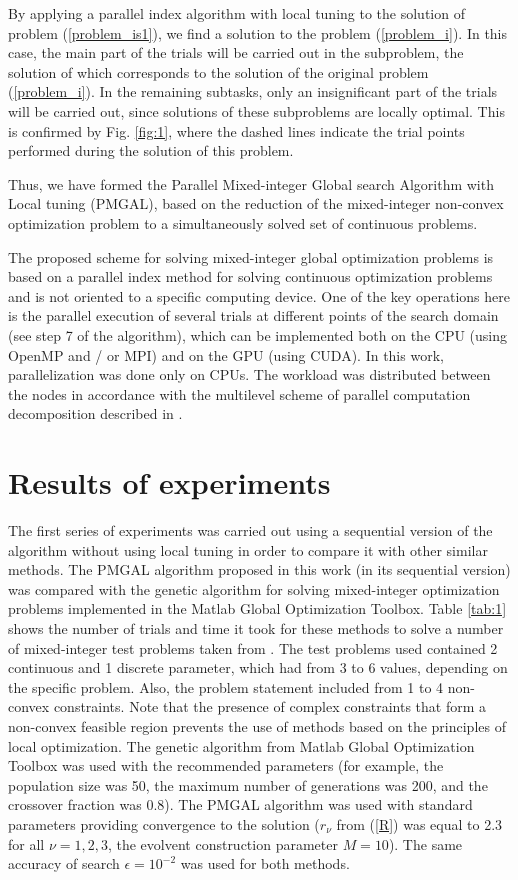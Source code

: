 \documentclass[
11pt,%
tightenlines,%
twoside,%
onecolumn,%
nofloats,%
nobibnotes,%
nofootinbib,%
superscriptaddress,%
noshowpacs,%
centertags]%
{revtex4}
\begin{document}
By applying a parallel index algorithm with local tuning to the solution of problem  (\ref{problem_is1}), we find a solution to the problem  (\ref{problem_i}). In this case, the main part of the trials will be carried out in the subproblem, the solution of which corresponds to the solution of the original problem (\ref{problem_i}). In the remaining subtasks, only an insignificant part of the trials will be carried out, since solutions of these subproblems are locally optimal. This is confirmed by Fig. \ref{fig:1}, where the dashed lines indicate the trial points performed during the solution of this problem.

Thus, we have formed the Parallel Mixed-integer Global search Algorithm with Local tuning (PMGAL), based on the reduction of the mixed-integer non-convex optimization problem to a simultaneously solved set of continuous problems.

The proposed scheme for solving mixed-integer global optimization problems is based on a parallel index method for solving continuous optimization problems and is not oriented to a specific computing device.  One of the key operations here is the parallel execution of several trials at different points of the search domain (see step 7 of the algorithm), which can be implemented both on the CPU (using OpenMP and / or MPI) and on the GPU (using CUDA). 
In this work, parallelization was done only on CPUs. The workload was distributed between the nodes in accordance with the multilevel scheme of parallel computation decomposition described in \cite{Strongin2018,Barkalov2020}.

\section{Results of experiments}

The first series of experiments was carried out using a sequential version of the algorithm without using local tuning in order to compare it with other similar methods.
The PMGAL algorithm proposed in this work (in its sequential version) was compared with the genetic algorithm for solving mixed-integer optimization problems implemented in the Matlab Global Optimization Toolbox. Table \ref{tab:1} shows the number of trials and time it took for these methods to solve a number of mixed-integer test problems taken from \cite{Deep,Floudas}.  
The test problems used contained 2 continuous and 1 discrete parameter, which had from 3 to 6 values, depending on the specific problem.
Also, the problem statement included from 1 to 4 non-convex constraints.  
Note that the presence of complex constraints that form a non-convex feasible region prevents the use of methods based on the principles of local optimization. 
The genetic algorithm from Matlab Global Optimization Toolbox was used with the recommended parameters (for example, the population size was 50, the maximum number of generations was 200, and the crossover fraction was 0.8). The PMGAL algorithm was used with standard parameters providing convergence to the solution ($r_\nu$ from (\ref{R}) was equal to 2.3 for all $\nu = 1,2,3$, the evolvent construction parameter $M=10$).
The same accuracy of search $\epsilon = 10^{-2}$ was used for both methods.
\end{document}
